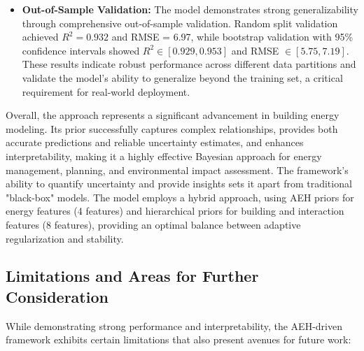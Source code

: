 \begin{itemize}
\item \textbf{Out-of-Sample Validation:} The model demonstrates strong generalizability through comprehensive out-of-sample validation. Random split validation achieved $R^2 = 0.932$ and RMSE = 6.97, while bootstrap validation with 95\% confidence intervals showed $R^2 \in [0.929, 0.953]$ and RMSE $\in [5.75, 7.19]$. These results indicate robust performance across different data partitions and validate the model's ability to generalize beyond the training set, a critical requirement for real-world deployment.
\end{itemize}

Overall, the approach represents a significant advancement in building energy modeling. Its prior successfully captures complex relationships, provides both accurate predictions and reliable uncertainty estimates, and enhances interpretability, making it a highly effective Bayesian approach for energy management, planning, and environmental impact assessment. The framework's ability to quantify uncertainty and provide insights sets it apart from traditional "black-box" models. The model employs a hybrid approach, using AEH priors for energy features (4 features) and hierarchical priors for building and interaction features (8 features), providing an optimal balance between adaptive regularization and stability.

\subsection{Limitations and Areas for Further Consideration}

While demonstrating strong performance and interpretability, the AEH-driven framework exhibits certain limitations that also present avenues for future work:

